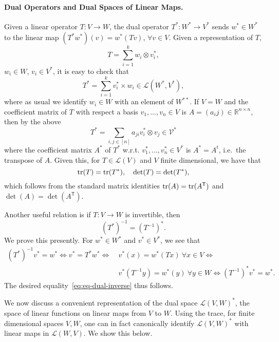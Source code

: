\documentclass[11pt]{article}
\theoremstyle{plain}
\theoremstyle{plain}
\newcommand{\T}{\ensuremath{\mathsf{T}}}
\newcommand{\R}{\ensuremath{\mathbb{R}}}
\begin{document}
\paragraph{\bf Dual Operators and Dual Spaces of Linear Maps.} 

Given a linear operator $T: V \rightarrow W$, the dual operator $T^*: W^* \rightarrow
V^*$ sends $w^* \in W^*$ to the linear map $(T^* w^*)(v) = w^*(Tv)$, $\forall v
\in V$. Given a representation of $T$,
\[
T = \sum_{i=1}^k w_i \otimes v_i^*, 
\]
$w_i \in W$, $v_i \in V^*$, it is easy to check that
\[
T^* = \sum_{i=1}^k v_i^* \times w_i \in \mathcal{L}(W^*,V^*),
\] 
where as usual we identify $w_i \in W$ with an element of $W^{**}$. If $V=W$ and
the coefficient matrix of $T$ with respect a basis $v_1,\dots,v_n \in V$ is
$A=(a_ij) \in \R^{n \times n}$, then by the above
\[
T^* = \sum_{i,j \in [n]} a_{ji} v_i^* \otimes v_j \in \mathcal{V^*}
\]
where the coefficient matrix $A^*$ of $T^*$ w.r.t. $v_1^*,\dots,v_n^* \in V^*$
is $A^* = A^t$, i.e.~the transpose of $A$. Given this, for $T \in
\mathcal{L}(V)$ and $V$ finite dimensional, we have that
\[
{\rm tr}(T) = {\rm tr}(T^*), \quad \det(T) = \det(T^*),
\] 
which follows from the standard matrix identities ${\rm tr}(A) = {\rm tr}(A^\T)$
and $\det(A) = \det(A^\T)$.

Another useful relation is if $T: V \rightarrow W$ is invertible, then
\begin{equation}
\label{eq:eq-dual-inverse}
(T^{*})^{-1} = (T^{-1})^*.
\end{equation}
We prove this presently. For $w^* \in W^*$ and $v^* \in V^*$, we see that
\begin{align*}
(T^*)^{-1} v^* = w^* \Leftrightarrow
v^* = T^* w^*  \Leftrightarrow
&~v^*(x) = w^*(T x) ~ \forall x \in V \Leftrightarrow \\
&~v^*(T^{-1} y)= w^*(y)  ~ \forall y \in W \Leftrightarrow (T^{-1})^* v^* = w^*.
\end{align*}
The desired equality~\eqref{eq:eq-dual-inverse} thus follows.

We now discuss a convenient representation of the dual space
$\mathcal{L}(V,W)^*$, the space of linear functions on linear maps from $V$ to
$W$. Using the trace, for finite dimensional spaces $V,W$, one can in fact
canonically identify $\mathcal{L}(V,W)^*$ with linear maps in
$\mathcal{L}(W,V)$. We show this below. 
\end{document}
